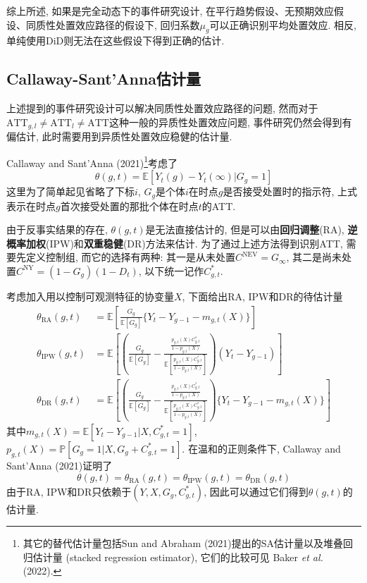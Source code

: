 \documentclass[cn,sakura,14pt,screen,bibstyle=gb7714-2015,math=mtpro2]{elegantnote}
\newcommand{\E}{\mathbb{E}}
\newcommand{\X}{X}
\begin{document}
综上所述, 如果是完全动态下的事件研究设计, 在平行趋势假设、无预期效应假设、同质性处置效应路径的假设下, 回归系数$\mu_g$可以正确识别平均处置效应. 相反, 单纯使用DiD则无法在这些假设下得到正确的估计.


\subsection{Callaway-Sant'Anna估计量}
上述提到的事件研究设计可以解决同质性处置效应路径的问题, 然而对于$\text{ATT}_{g,l}\neq\text{ATT}_l\ne\text{ATT}$这种一般的异质性处置效应问题, 事件研究仍然会得到有偏估计, 此时需要用到异质性处置效应稳健的估计量.

Callaway and Sant'Anna (2021)\footnote{其它的替代估计量包括Sun and Abraham (2021)提出的SA估计量以及堆叠回归估计量 (stacked regression estimator), 它们的比较可见 Baker \emph{et al.} (2022).}考虑了
$$\theta(g,t)=\E[Y_{t}(g)-Y_{t}(\infty)|G_g=1]$$
这里为了简单起见省略了下标$i$, $G_g$是个体$i$在时点$g$是否接受处置时的指示符, 上式表示在时点$g$首次接受处置的那批个体在时点$t$的ATT.

由于反事实结果的存在, $\theta(g,t)$是无法直接估计的, 但是可以由\textbf{回归调整}(RA), \textbf{逆概率加权}(IPW)和\textbf{双重稳健}(DR)方法来估计. 为了通过上述方法得到识别ATT, 需要先定义控制组, 而它的选择有两种: 其一是从未处置$C^\text{NEV}=G_\infty$, 其二是尚未处置$C^\text{NY}=(1-G_g)(1-D_t)$, 以下统一记作$C_{g,t}^\ast$.

考虑加入用以控制可观测特征的协变量$\X$, 下面给出RA, IPW和DR的待估计量
\begin{align*}
\theta_\text{RA}(g,t)&=\E\left[\frac{G_g}{\E[G_g]}\{Y_t-Y_{g-1}-m_{g,t}({X})\}\right] \\
\theta_\text{IPW}(g,t)&=\E\left[\left(\frac{G_g}{\E[G_g]}-\frac{\frac{p_{g,t}(\X)C_{g,t}^\ast}{1-p_{g,t}(\X)}}{\E\left[\frac{p_{g,t}(\X)C_{g,t}^\ast}{1-p_{g,t}(\X)}\right]}\right)(Y_t-Y_{g-1})\right] \\
\theta_{\text{DR}}(g,t)&=\E\left[\left(\frac{G_g}{\E[G_g]}-\frac{\frac{p_{g,t}(\X)C_{g,t}^\ast}{1-p_{g,t}(\X)}}{\E\left[\frac{p_{g,t}(\X)C_{g,t}^\ast}{1-p_{g,t}(\X)}\right]}\right)\{Y_t-Y_{g-1}-m_{g,t}(\X)\}\right]
\end{align*}
其中$m_{g,t}(X)=\E[Y_t-Y_{g-1}|X,C_{g,t}^\ast=1]$, $p_{g,t}(X)=\mathbb{P}[G_g=1|X,G_g+C_{g,t}^\ast=1]$. 在温和的正则条件下, Callaway and Sant'Anna (2021)证明了
$$\theta(g,t)=\theta_\text{RA}(g,t)=\theta_\text{IPW}(g,t)=\theta_\text{DR}(g,t)$$
由于RA, IPW和DR只依赖于$(Y,X,G_g,C_{g,t}^\ast)$, 因此可以通过它们得到$\theta(g,t)$的估计量.
\end{document}
